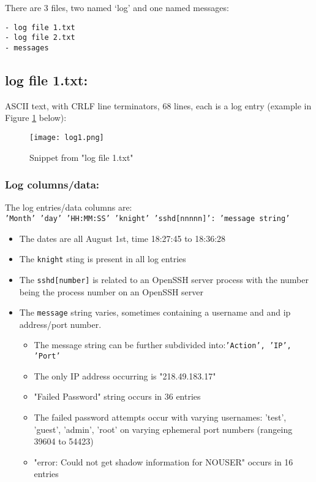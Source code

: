 \documentclass[
	letterpaper, %
	10pt, %
	unnumberedsections, %
	twoside, %
]{APAAssignment}
\begin{document}
There are 3 files, two named `log' and one named messages:

\begin{verbatim}
- log file 1.txt
- log file 2.txt
- messages
\end{verbatim}

\subsection{log file 1.txt:}\label{log-file-1.txt}
ASCII text, with CRLF line terminators, 68 lines, each is a log entry (example in Figure \ref{fig:log1} below): \\

\begin{figure}[!htp] %
	\centering
	\texttt{[image: log1.png]}
	\caption{Snippet from "log file 1.txt"}	\label{fig:log1}
\end{figure}

\subsubsection{Log columns/data:} The log entries/data columns are: \\
\texttt{'Month' 'day' 'HH:MM:SS' 'knight' 'sshd[nnnnn]': 'message string'}
\begin{itemize}
  \item The dates are all August 1st, time 18:27:45 to 18:36:28
  \item The \texttt{knight} sting is present in all log entries
  \item The \texttt{sshd{[}number{]}} is related to an OpenSSH server process with the number being the process number on an OpenSSH server 
  \item The \texttt{message} string varies, sometimes containing a username and and ip address/port number.
  \begin{itemize}
	\item The message string can be further subdivided into:\texttt{'Action', 'IP', 'Port'}
	\item The only IP address occurring is "218.49.183.17"
	\item "Failed Password" string occurs in 36 entries
	\item The failed password attempts occur with varying usernames: 'test', 'guest', 'admin', 'root' on varying ephemeral port numbers (rangeing 39604 to 54423)
	\item "error: Could not get shadow information for NOUSER" occurs in 16 entries
  \end{itemize}
\end{itemize}
\end{document}
